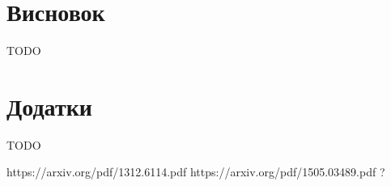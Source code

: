 \documentclass[14pt,a4paper]{extarticle}
\newcounter{e}
\numberwithin{equation}{section}
\numberwithin{figure}{section}
\begin{document}
		
	\newpage
	\thispagestyle{empty}
	\section*{Висновок}
	TODO
	
	\newpage
	\thispagestyle{empty}
	\section*{Додатки}
	TODO
	
	
	\newpage
	\thispagestyle{empty}
	
	\nocite{ongie2020deep}
	\nocite{Goodfellow-et-al-2016}
	\nocite{Adler_2017}
	\nocite{NIPS2012_6cdd60ea}
	\nocite{raj2019ganbased}
	\nocite{Aggarwal_2019}
	\nocite{kingma2014autoencoding}
	\printbibliography[title={Література}]

	https://arxiv.org/pdf/1312.6114.pdf
	https://arxiv.org/pdf/1505.03489.pdf ?
	
\end{document}
